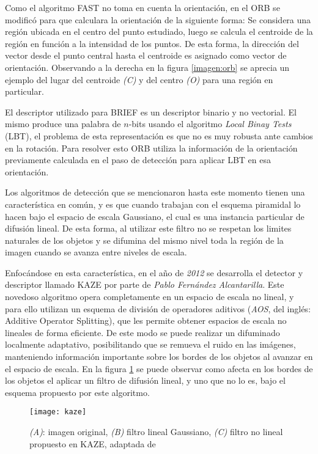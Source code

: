 Como el algoritmo FAST no toma en cuenta la orientación, en el ORB se modificó para que calculara la orientación de la siguiente forma: Se considera una región ubicada en el centro del punto estudiado, luego se calcula el centroide de la región en función a la intensidad de los puntos. De esta forma, la dirección del vector desde el punto central  hasta el centroide es asignado como vector de orientación. Observando a la derecha en la figura \ref{imagen:orb} se aprecia un ejemplo del lugar del centroide \textit{(C)} y del centro \textit{(O)} para una región en particular.

El descriptor utilizado para BRIEF es un descriptor binario y no vectorial. El mismo produce una palabra de $n$-bits usando el algoritmo \textit{Local Binay Tests} (LBT), el problema de esta representación es que no es muy robusta ante cambios en la rotación. Para resolver esto ORB utiliza la información de la orientación previamente calculada en el paso de detección para aplicar LBT en esa orientación.

Los algoritmos de detección que se mencionaron hasta este momento tienen una característica en común, y es que cuando trabajan con el esquema piramidal lo hacen bajo el espacio de escala Gaussiano, el cual es una instancia particular de difusión lineal. De esta forma, al utilizar este filtro no se respetan los limites naturales de los objetos y se difumina del mismo nivel toda la región de la imagen cuando se avanza entre niveles de escala.

Enfocándose en esta característica, en el año de \textit{2012} se desarrolla el detector y descriptor llamado KAZE \cite{kaze} por parte de \textit{Pablo Fernández Alcantarilla}. Este novedoso algoritmo opera completamente en un espacio de escala no lineal, y para ello utilizan un esquema de división de operadores aditivos (\textit{AOS}, del inglés: Additive Operator Splitting), que les permite obtener espacios de escala no lineales de forma eficiente. De este modo se puede realizar un difuminado localmente adaptativo, posibilitando que se remueva el ruido en las imágenes, manteniendo información importante sobre los bordes de los objetos al avanzar en el espacio de escala. En la figura \ref{imagen:kaze} se puede observar como afecta en los bordes de los objetos el aplicar un filtro de difusión lineal, y uno que no lo es, bajo el esquema propuesto por este algoritmo.

\begin{figure}[H]
	\centering
	\texttt{[image: kaze]}
	\caption[Filtro no lineal propuesto por KAZE]{\textit{(A)}: imagen original, \textit{(B)} filtro lineal Gaussiano, \textit{(C)} filtro no lineal propuesto en KAZE, adaptada de \cite{kaze}}
	\label{imagen:kaze}
\end{figure}


